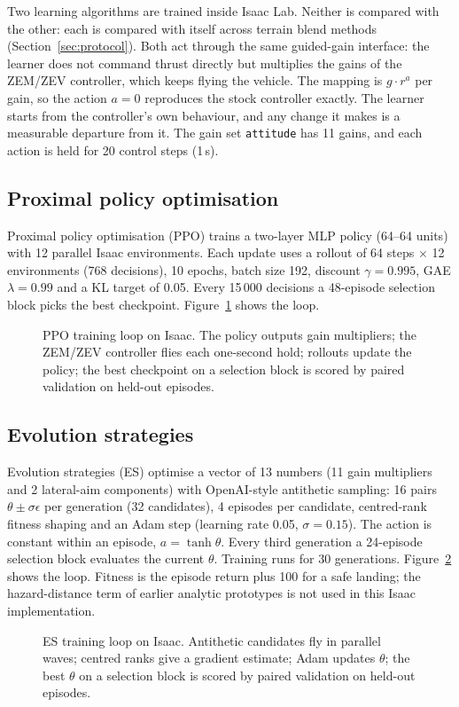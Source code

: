 Two learning algorithms are trained inside Isaac Lab. Neither is compared with the other: each is compared with itself across terrain blend methods (Section~\ref{sec:protocol}). Both act through the same guided-gain interface: the learner does not command thrust directly but multiplies the gains of the ZEM/ZEV controller, which keeps flying the vehicle. The mapping is $g\cdot r^{a}$ per gain, so the action $a=0$ reproduces the stock controller exactly. The learner starts from the controller's own behaviour, and any change it makes is a measurable departure from it. The gain set \texttt{attitude} has 11 gains, and each action is held for 20 control steps (1\,s).

\subsection{Proximal policy optimisation}\label{sec:ppo}
Proximal policy optimisation (PPO) trains a two-layer MLP policy (64--64 units) with 12 parallel Isaac environments. Each update uses a rollout of 64 steps $\times$ 12 environments (768 decisions), 10 epochs, batch size 192, discount $\gamma=0.995$, GAE $\lambda=0.99$ and a KL target of 0.05. Every 15\,000 decisions a 48-episode selection block picks the best checkpoint. Figure~\ref{fig:flow-ppo} shows the loop.

\begin{figure}[t]
  \centering
  \resizebox{\linewidth}{!}{}
  \caption{PPO training loop on Isaac. The policy outputs gain multipliers; the ZEM/ZEV controller flies each one-second hold; rollouts update the policy; the best checkpoint on a selection block is scored by paired validation on held-out episodes.}
  \label{fig:flow-ppo}
\end{figure}

\subsection{Evolution strategies}\label{sec:es}
Evolution strategies (ES) optimise a vector of 13 numbers (11 gain multipliers and 2 lateral-aim components) with OpenAI-style antithetic sampling: 16 pairs $\theta\pm\sigma\epsilon$ per generation (32 candidates), 4 episodes per candidate, centred-rank fitness shaping and an Adam step (learning rate 0.05, $\sigma=0.15$). The action is constant within an episode, $a=\tanh\theta$. Every third generation a 24-episode selection block evaluates the current $\theta$. Training runs for 30 generations. Figure~\ref{fig:flow-es} shows the loop. Fitness is the episode return plus 100 for a safe landing; the hazard-distance term of earlier analytic prototypes is not used in this Isaac implementation.

\begin{figure}[t]
  \centering
  \resizebox{\linewidth}{!}{}
  \caption{ES training loop on Isaac. Antithetic candidates fly in parallel waves; centred ranks give a gradient estimate; Adam updates $\theta$; the best $\theta$ on a selection block is scored by paired validation on held-out episodes.}
  \label{fig:flow-es}
\end{figure}
